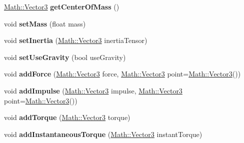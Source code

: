 \begin{DoxyCompactItemize}
\item 
\hypertarget{classBrickware_1_1Core_1_1Body_a7f95845584e5dc67076f1faf8118a799}{}\hyperlink{classBrickware_1_1Math_1_1Vector3}{Math\+::\+Vector3} {\bfseries get\+Center\+Of\+Mass} ()\label{classBrickware_1_1Core_1_1Body_a7f95845584e5dc67076f1faf8118a799}

\item 
\hypertarget{classBrickware_1_1Core_1_1Body_a444eec718be5fdd7c110d3288a3e5085}{}void {\bfseries set\+Mass} (float mass)\label{classBrickware_1_1Core_1_1Body_a444eec718be5fdd7c110d3288a3e5085}

\item 
\hypertarget{classBrickware_1_1Core_1_1Body_afd5e357d4d65d44d2e977940a5a1eea5}{}void {\bfseries set\+Inertia} (\hyperlink{classBrickware_1_1Math_1_1Vector3}{Math\+::\+Vector3} inertia\+Tensor)\label{classBrickware_1_1Core_1_1Body_afd5e357d4d65d44d2e977940a5a1eea5}

\item 
\hypertarget{classBrickware_1_1Core_1_1Body_a5e5b912e4084316e441e227e12411eb5}{}void {\bfseries set\+Use\+Gravity} (bool use\+Gravity)\label{classBrickware_1_1Core_1_1Body_a5e5b912e4084316e441e227e12411eb5}

\item 
\hypertarget{classBrickware_1_1Core_1_1Body_a70d61d928ff0daf9393102eefdc97b97}{}void {\bfseries add\+Force} (\hyperlink{classBrickware_1_1Math_1_1Vector3}{Math\+::\+Vector3} force, \hyperlink{classBrickware_1_1Math_1_1Vector3}{Math\+::\+Vector3} point=\hyperlink{classBrickware_1_1Math_1_1Vector3}{Math\+::\+Vector3}())\label{classBrickware_1_1Core_1_1Body_a70d61d928ff0daf9393102eefdc97b97}

\item 
\hypertarget{classBrickware_1_1Core_1_1Body_a621ee4ef5ba7e18d53ecf3574e2544c9}{}void {\bfseries add\+Impulse} (\hyperlink{classBrickware_1_1Math_1_1Vector3}{Math\+::\+Vector3} impulse, \hyperlink{classBrickware_1_1Math_1_1Vector3}{Math\+::\+Vector3} point=\hyperlink{classBrickware_1_1Math_1_1Vector3}{Math\+::\+Vector3}())\label{classBrickware_1_1Core_1_1Body_a621ee4ef5ba7e18d53ecf3574e2544c9}

\item 
\hypertarget{classBrickware_1_1Core_1_1Body_aad65cdd42941b18fdd895afec0c6b4a9}{}void {\bfseries add\+Torque} (\hyperlink{classBrickware_1_1Math_1_1Vector3}{Math\+::\+Vector3} torque)\label{classBrickware_1_1Core_1_1Body_aad65cdd42941b18fdd895afec0c6b4a9}

\item 
\hypertarget{classBrickware_1_1Core_1_1Body_ae7d63db29b518a86b1547a63514da6c2}{}void {\bfseries add\+Instantaneous\+Torque} (\hyperlink{classBrickware_1_1Math_1_1Vector3}{Math\+::\+Vector3} instant\+Torque)\label{classBrickware_1_1Core_1_1Body_ae7d63db29b518a86b1547a63514da6c2}


\end{DoxyCompactItemize}
